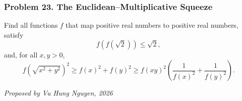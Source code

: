 \subsubsection*{Problem 23. The Euclidean--Multiplicative Squeeze}

\begin{exercisebox}[hard]

Find all functions $f$ that map positive real numbers to positive real
numbers, satisfy
\[
f(f(\sqrt2))\leq\sqrt2,
\]
and, for all $x,y>0$,
\[
f\!\left(\sqrt{x^2+y^2}\right)^2
\geq f(x)^2+f(y)^2
\geq f(xy)^2\left(\frac1{f(x)^2}+\frac1{f(y)^2}\right).
\]

\begin{flushright}
\textit{Proposed by Vu Hung Nguyen, 2026}
\end{flushright}


\end{exercisebox}